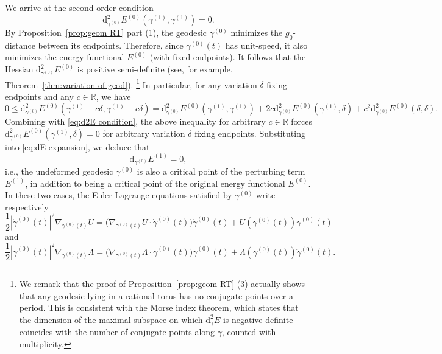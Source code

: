 \documentclass[11pt,letterpaper,oneside]{amsart}
\newcommand{\R}{\mathbb{R}}
\theoremstyle{definition}
\theoremstyle{remark}
\theoremstyle{definition}
\theoremstyle{remark}
\newcommand{\dif}{\mathrm{d}}
\begin{document}
We arrive at the second-order condition 
\begin{equation}\label{eq:d2E condition}
    \dif^2_{\gamma^{(0)}}E^{(0)}(\gamma^{(1)},\gamma^{(1)}) = 0.   
\end{equation}
By Proposition~\ref{prop:geom RT} part (1), the geodesic $\gamma^{(0)}$ minimizes the $g_0$-distance between its endpoints.
Therefore, since $\gamma^{(0)}(t)$ has unit-speed, it also minimizes the energy functional $E^{(0)}$ (with fixed endpoints).
It follows that the Hessian $\dif^2_{\gamma^{(0)}}E^{(0)}$ is positive semi-definite (see, for example, Theorem~\ref{thm:variation of geod}). 
\footnote{We remark that the proof of Proposition~\ref{prop:geom RT} (3) actually shows that any geodesic lying in a rational torus has no conjugate points over a period. This is consistent with the Morse index theorem, which states that the dimension of the maximal subspace on which $\dif^2_\gamma E$ is negative definite coincides with the number of conjugate points along $\gamma$, counted with multiplicity.} 
In particular, for any variation $\delta$ fixing endpoints and any $c \in \R$, we have 
\begin{equation*}
    0 \leq \dif^2_{\gamma^{(0)}}E^{(0)}(\gamma^{(1)} + c\delta, \gamma^{(1)} + c\delta) = \dif^2_{\gamma^{(0)}}E^{(0)}(\gamma^{(1)}, \gamma^{(1)}) + 2 c  \dif^2_{\gamma^{(0)}}E^{(0)}(\gamma^{(1)},\delta) + c^2  \dif^2_{\gamma^{(0)}}E^{(0)}(\delta, \delta).
\end{equation*}
Combining with \eqref{eq:d2E condition}, the above inequality for arbitrary $c \in \R$ forces $\dif^2_{\gamma^{(0)}}E^{(0)}(\gamma^{(1)},\delta) = 0$ for arbitrary variation $\delta$ fixing endpoints.
Substituting into \eqref{eq:dE expansion}, we deduce that 
\begin{equation*}    
    \dif_{\gamma^{(0)}}E^{(1)} = 0,
\end{equation*} 
 i.e., the undeformed geodesic $\gamma^{(0)}$ is also a critical point of the perturbing term $E^{(1)}$, in addition to being a critical point of the original energy functional $E^{(0)}$.
In these two cases, the Euler-Lagrange equations satisfied by $\gamma^{(0)}$ write respectively
\begin{equation*}
    \frac{1}{2} |\dot \gamma^{(0)}(t)|^2\nabla_{\gamma^{(0)}(t)} U 
    = \big(\nabla_{\gamma^{(0)}(t)}U \cdot  \dot \gamma^{(0)}(t)\big) \dot \gamma^{(0)}(t)   + U(\gamma^{(0)}(t) ) \ddot \gamma^{(0)}(t)
\end{equation*}
and 
\begin{equation*}
    \frac{1}{2} |\dot \gamma^{(0)}(t)|^2\nabla_{\gamma^{(0)}(t)} \Lambda 
    = \big(\nabla_{\gamma^{(0)}(t)}\Lambda \cdot  \dot \gamma^{(0)}(t)\big) \dot \gamma^{(0)}(t)   + \Lambda(\gamma^{(0)}(t) ) \ddot \gamma^{(0)}(t).
\end{equation*}
\end{document}
